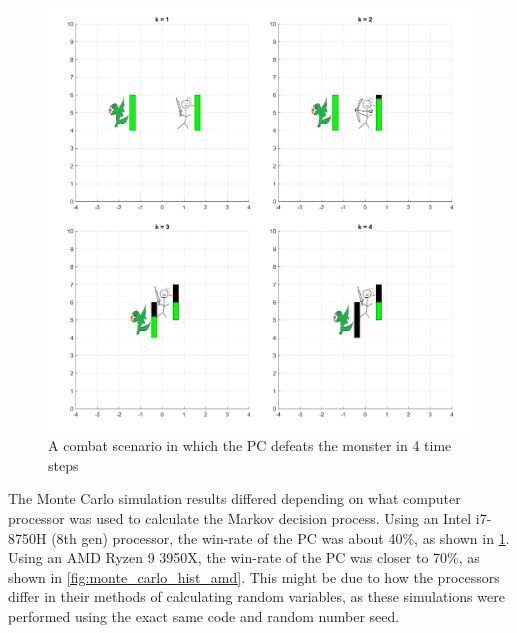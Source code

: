 \documentclass[letterpaper, 10 pt, conference]{ieeeconf}
\begin{document}
\begin{figure}[h]
\centering
\includegraphics[scale = 0.2]{figs/DND_SingleSim_Animation_rng_seed=1997.png}
\caption{A combat scenario in which the PC defeats the monster in 4 time steps}
\label{fig:single_sim_animation_1997}
\end{figure}

The Monte Carlo simulation results differed depending on what computer processor was used to calculate the Markov decision 
process. Using an Intel i7-8750H (8th gen) processor, the win-rate of the PC was about 40\%, as shown in \cref{fig:single_sim_animation_1997}. 
Using an AMD Ryzen 9 3950X, the win-rate of the PC was closer to 70\%, as shown in \cref{fig:monte_carlo_hist_amd}. 
This might be due to how the processors differ in their methods of calculating random variables, as these simulations were performed using the exact same code and random number seed.
\end{document}
